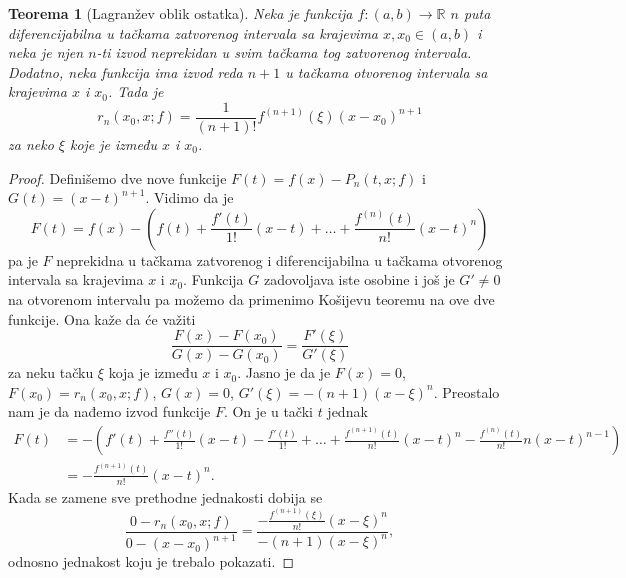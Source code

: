 \documentclass[a4paper,12pt]{article}
\theoremstyle{plain}
\newtheorem{theorem}{Teorema}[section]
\theoremstyle{definition}
\theoremstyle{remark}
\begin{document}
\begin{theorem}[Lagranžev oblik ostatka]
Neka je funkcija $f: (a, b) \to \mathbb{R}$ $n$ puta diferencijabilna u tačkama zatvorenog intervala sa krajevima $x, x_0 \in (a, b)$ i neka je njen $n$-ti izvod neprekidan u svim tačkama tog zatvorenog intervala. Dodatno, neka funkcija ima izvod reda $n+1$ u tačkama otvorenog intervala sa krajevima $x$ i $x_0$. Tada je
$$
r_n(x_0, x; f) = \frac{1}{(n+1)!} f^{(n+1)}(\xi)(x - x_0)^{n+1}
$$
za neko $\xi$ koje je između $x$ i $x_0$.
\end{theorem}

\begin{proof}
Definišemo dve nove funkcije $F(t) = f(x) - P_n(t, x; f)$ i $G(t) = (x - t)^{n+1}$. Vidimo da je
$$
F(t) = f(x) - \left( f(t) + \frac{f'(t)}{1!}(x - t) + \dots + \frac{f^{(n)}(t)}{n!}(x - t)^n \right)
$$
pa je $F$ neprekidna u tačkama zatvorenog i diferencijabilna u tačkama otvorenog intervala sa krajevima $x$ i $x_0$. Funkcija $G$ zadovoljava iste osobine i još je $G' \neq 0$ na otvorenom intervalu pa možemo da primenimo Košijevu teoremu na ove dve funkcije. Ona kaže da će važiti
$$
\frac{F(x) - F(x_0)}{G(x) - G(x_0)} = \frac{F'(\xi)}{G'(\xi)}
$$
za neku tačku $\xi$ koja je između $x$ i $x_0$. Jasno je da je $F(x) = 0$, $F(x_0) = r_n(x_0, x; f)$, $G(x) = 0$, $G'(\xi) = -(n+1)(x - \xi)^n$. Preostalo nam je da nađemo izvod funkcije $F$. On je u tački $t$ jednak
\begin{align*}
F(t) &= - \left( f'(t) + \frac{f''(t)}{1!}(x - t) - \frac{f'(t)}{1!} + \dots + \frac{f^{(n+1)}(t)}{n!}(x - t)^n - \frac{f^{(n)}(t)}{n!} n(x - t)^{n-1} \right) \\
&= - \frac{f^{(n+1)}(t)}{n!} (x - t)^n.
\end{align*}
Kada se zamene sve prethodne jednakosti dobija se
$$
\frac{0 - r_n(x_0, x; f)}{0 - (x - x_0)^{n+1}} = \frac{-\frac{f^{(n+1)}(\xi)}{n!} (x - \xi)^n}{-(n+1)(x - \xi)^n},
$$
odnosno jednakost koju je trebalo pokazati.
\end{proof}
\end{document}
